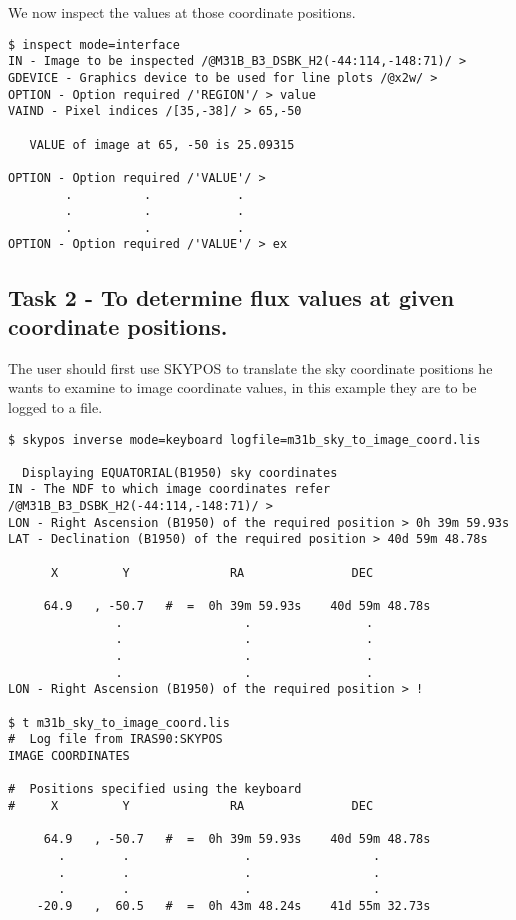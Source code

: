 We now inspect the values at those coordinate positions.
\begin{small}
\begin{verbatim}
$ inspect mode=interface
IN - Image to be inspected /@M31B_B3_DSBK_H2(-44:114,-148:71)/ > 
GDEVICE - Graphics device to be used for line plots /@x2w/ > 
OPTION - Option required /'REGION'/ > value
VAIND - Pixel indices /[35,-38]/ > 65,-50

   VALUE of image at 65, -50 is 25.09315

OPTION - Option required /'VALUE'/ > 
        .          .            .
        .          .            .
        .          .            .
OPTION - Option required /'VALUE'/ > ex
\end{verbatim}
\end{small}
\subsection {Task 2  - To determine flux values at given coordinate positions.}
\label{a:exkappa2}
The user should first use SKYPOS to translate the sky coordinate positions he
wants to examine to image coordinate values, in this example they are to be
logged to a file.
\begin{small}
\begin{verbatim}
$ skypos inverse mode=keyboard logfile=m31b_sky_to_image_coord.lis

  Displaying EQUATORIAL(B1950) sky coordinates
IN - The NDF to which image coordinates refer /@M31B_B3_DSBK_H2(-44:114,-148:71)/ > 
LON - Right Ascension (B1950) of the required position > 0h 39m 59.93s
LAT - Declination (B1950) of the required position > 40d 59m 48.78s

      X         Y              RA               DEC

     64.9   , -50.7   #  =  0h 39m 59.93s    40d 59m 48.78s
               .                 .                .
               .                 .                .
               .                 .                .
               .                 .                .
LON - Right Ascension (B1950) of the required position > !

$ t m31b_sky_to_image_coord.lis
#  Log file from IRAS90:SKYPOS
IMAGE COORDINATES
 
#  Positions specified using the keyboard
#     X         Y              RA               DEC 
 
     64.9   , -50.7   #  =  0h 39m 59.93s    40d 59m 48.78s  
       .        .                .                 .
       .        .                .                 .
       .        .                .                 .
    -20.9   ,  60.5   #  =  0h 43m 48.24s    41d 55m 32.73s

\end{verbatim}
\end{small}

